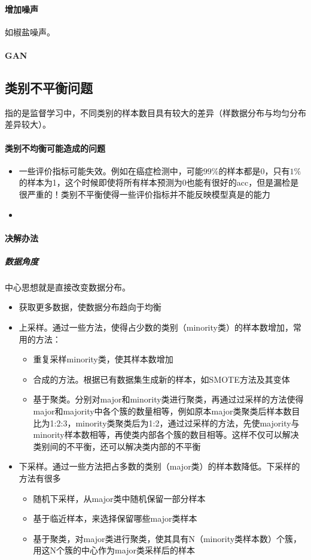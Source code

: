 \paragraph{增加噪声}
如椒盐噪声。

\paragraph{GAN}


\subsection{类别不平衡问题}
指的是监督学习中，不同类别的样本数目具有较大的差异（样数据分布与均匀分布差异较大）。
\paragraph{类别不均衡可能造成的问题}
\begin{itemize}
	\item 一些评价指标可能失效。例如在癌症检测中，可能$99\%$的样本都是0，只有$1\%$的样本为1，这个时候即使将所有样本预测为0也能有很好的acc，但是漏检是很严重的！类别不平衡使得一些评价指标并不能反映模型真是的能力
	\item 
\end{itemize}

\paragraph{决解办法}
\subparagraph{数据角度}
中心思想就是直接改变数据分布。
\begin{itemize}
	\item 获取更多数据，使数据分布趋向于均衡
	\item 上采样。通过一些方法，使得占少数的类别（minority类）的样本数增加，常用的方法：
	\begin{itemize}
		\item 重复采样minority类，使其样本数增加
		\item 合成的方法。根据已有数据集生成新的样本，如SMOTE方法及其变体
		\item 基于聚类。分别对major和minority类进行聚类，再通过过采样的方法使得major和majority中各个簇的数量相等，例如原本major类聚类后样本数目比为1:2:3，minority类聚类后为1:2，通过过采样的方法，先使majority与minority样本数相等，再使类内部各个簇的数目相等。这样不仅可以解决类别间的不平衡，还可以解决类内部的不平衡
	\end{itemize}
	\item 下采样。通过一些方法把占多数的类别（major类）的样本数降低。下采样的方法有很多
	\begin{itemize}
		\item 随机下采样，从major类中随机保留一部分样本
		\item 基于临近样本，来选择保留哪些major类样本
		\item 基于聚类，对major类进行聚类，使其具有N（minority类样本数）个簇，用这N个簇的中心作为major类采样后的样本
	\end{itemize}
\end{itemize}

